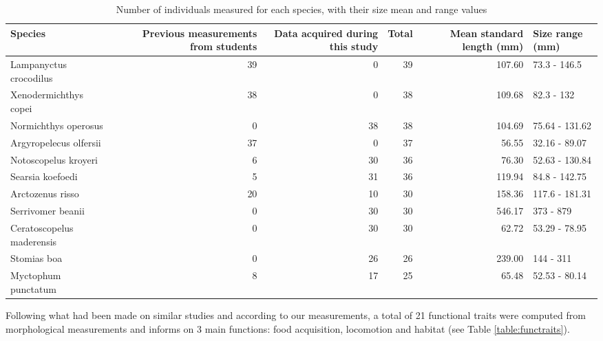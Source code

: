 \begin{table}[ht]
\centering
\caption{Number of individuals measured for each species, with their size mean and range values}
\label{table:spcount}
\begin{adjustbox}{max width=1.1\textwidth,center}
\begin{tabular}{lrrr|rl}
  \hline
Species & Previous measurements from students & Data acquired during this study & Total & Mean standard length (mm) & Size range (mm) \\ 
  \hline
Lampanyctus crocodilus &  39 &   0 &  39 & 107.60 & 73.3 - 146.5 \\ 
  Xenodermichthys copei &  38 &   0 &  38 & 109.68 & 82.3 - 132 \\ 
  Normichthys operosus &   0 &  38 &  38 & 104.69 & 75.64 - 131.62 \\ 
  Argyropelecus olfersii &  37 &   0 &  37 & 56.55 & 32.16 - 89.07 \\ 
  Notoscopelus kroyeri &   6 &  30 &  36 & 76.30 & 52.63 - 130.84 \\ 
  Searsia koefoedi &   5 &  31 &  36 & 119.94 & 84.8 - 142.75 \\ 
  Arctozenus risso &  20 &  10 &  30 & 158.36 & 117.6 - 181.31 \\ 
  Serrivomer beanii &   0 &  30 &  30 & 546.17 & 373 - 879 \\ 
  Ceratoscopelus maderensis &   0 &  30 &  30 & 62.72 & 53.29 - 78.95 \\ 
  Stomias boa &   0 &  26 &  26 & 239.00 & 144 - 311 \\ 
  Myctophum punctatum &   8 &  17 &  25 & 65.48 & 52.53 - 80.14 \\ 
   \hline
\end{tabular}
\end{adjustbox}
\end{table}


Following what had been made on similar studies and according to our measurements, a total of 21 functional traits were computed from morphological measurements and informs on 3 main functions: food acquisition, locomotion and habitat (see Table \ref{table:functraits}).

